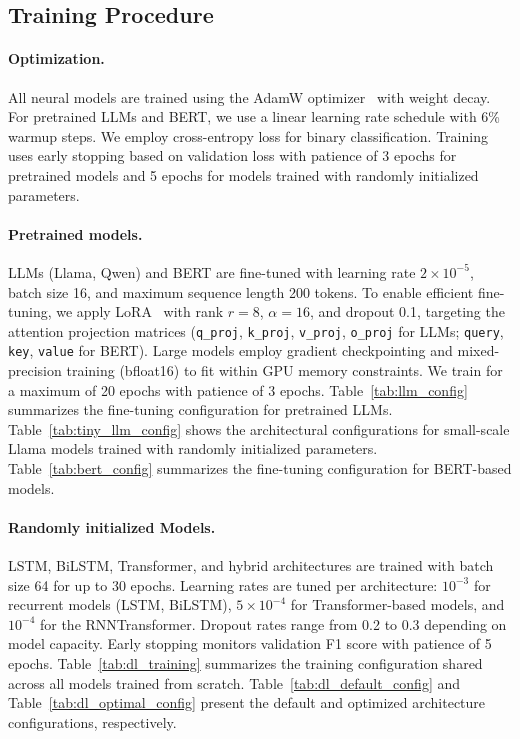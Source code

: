 \documentclass[fullpaper]{nldl}
\theoremstyle{plain}
\theoremstyle{definition}
\theoremstyle{remark}
\begin{document}
\subsection{Training Procedure}
\label{subsec:training_appendix}

\paragraph{Optimization.}
All neural models are trained using the AdamW optimizer~\citep{AdamW} with weight decay. For pretrained LLMs and BERT, we use a linear learning rate schedule with 6\% warmup steps. We employ cross-entropy loss for binary classification. Training uses early stopping based on validation loss with patience of 3 epochs for pretrained models and 5 epochs for models trained with randomly initialized parameters.

\paragraph{Pretrained models.}
LLMs (Llama, Qwen) and BERT are fine-tuned with learning rate $2 \times 10^{-5}$, batch size 16, and maximum sequence length 200 tokens. To enable efficient fine-tuning, we apply LoRA~\citep{LoRA} with rank $r=8$, $\alpha=16$, and dropout 0.1, targeting the attention projection matrices (\texttt{q\_proj}, \texttt{k\_proj}, \texttt{v\_proj}, \texttt{o\_proj} for LLMs; \texttt{query}, \texttt{key}, \texttt{value} for BERT). Large models employ gradient checkpointing and mixed-precision training (bfloat16) to fit within GPU memory constraints. We train for a maximum of 20 epochs with patience of 3 epochs. Table~\ref{tab:llm_config} summarizes the fine-tuning configuration for pretrained LLMs. Table~\ref{tab:tiny_llm_config} shows the architectural configurations for small-scale Llama models trained with randomly initialized parameters. Table~\ref{tab:bert_config} summarizes the fine-tuning configuration for BERT-based models.

\paragraph{Randomly initialized Models.}
LSTM, BiLSTM, Transformer, and hybrid architectures are trained with batch size 64 for up to 30 epochs. Learning rates are tuned per architecture: $10^{-3}$ for recurrent models (LSTM, BiLSTM), $5 \times 10^{-4}$ for Transformer-based models, and $10^{-4}$ for the RNNTransformer. Dropout rates range from 0.2 to 0.3 depending on model capacity. Early stopping monitors validation F1 score with patience of 5 epochs. Table~\ref{tab:dl_training} summarizes the training configuration shared across all models trained from scratch. Table~\ref{tab:dl_default_config} and Table~\ref{tab:dl_optimal_config} present the default and optimized architecture configurations, respectively.
\end{document}
